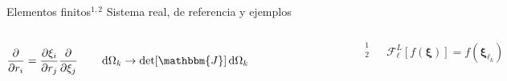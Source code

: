 

\begin{frame}{Elementos finitos$^{1,2}$}
{Sistema real, de referencia y ejemplos \hyperlink{fr:Apoyo}{\beamerreturnbutton{}}}\small

\begin{columns}
$$
    \pdv{r_i} = \pdv{\xi_i}{r_j} \pdv{\xi_j}
    \qquad
    \dd{\Omega_k} \to \det[\mathbbm{J}]\dd{\Omega_k}
$$
 \begin{figure}\centering    \fontsize{4}{5} \selectfont
        \def\svgwidth{\textwidth}
\end{figure}
\vspace*{1em}
	\noindent\rule{.25\textwidth}{0.4pt}
 \begin{spacing}{0}\fontsize{4}{12} \selectfont
	$^1$ \\
	$^2$ 
	\end{spacing}

$$  \mathcal{F}^{L}_\ell[f(\boldsymbol{\xi})] = f(\boldsymbol{\xi}_{\ell_k}) $$
\begin{figure} \fontsize{4}{5} \selectfont
    \def\svgwidth{\textwidth}
\end{figure}
\end{columns}
\end{frame}


